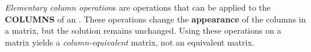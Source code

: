 \begin{definition}\label{def:Elementary_Column_Op}
  \emph{Elementary column operation}s are  operations that can be applied to the \textbf{COLUMNS} of an .
  These operations change the \textbf{appearance} of the columns in a matrix, but the solution remains unchanged.
  Using these operations on a matrix yields a \emph{column-equivalent} matrix, not an equivalent matrix.
\end{definition}

